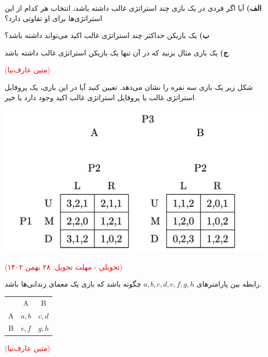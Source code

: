 \documentclass[11pt,a4paper]{article}
\begin{document}




\textbf{الف)}
آیا اگر فردی در یک بازی چند استراتژی غالب داشته باشد، انتخاب هر کدام از این استراتژی‌ها برای او تفاوتی دارد؟ 

\textbf{ب)}
یک بازیکن حداکثر چند استراتژی غالب اکید می‌تواند داشته باشد؟

\textbf{ج)}
یک بازی مثال بزنید که در آن تنها یک بازیکن استراتژی غالب داشته باشد. 

\vspace{0.5em}
\textcolor{red}{(متین عارف‌نیا)}




شکل زیر یک بازی سه نفره را نشان می‌دهد. تعیین کنید آیا در این بازی، یک پروفایل استراتژی غالب یا پروفایل استراتژی غالب اکید وجود دارد یا خیر.

	{\begin{center}\includegraphics[width=0.5\linewidth]{pics/DSE}\end{center}}

\vspace{0.5em}
\textcolor{red}{(تحویلی - مهلت تحویل: ۲۸ بهمن ۱۴۰۲)}




رابطه بین پارامترهای $a,b,c,d,e,f,g,h$ چگونه باشد که 
بازی یک معمای زندانی‌ها باشد.

\begin{latin}
	\begin{center}
		\begin{tabular}{ r|c|c| }
			\multicolumn{1}{r}{}
			&  \multicolumn{1}{c}{A}
			& \multicolumn{1}{c}{B} \\
			\cline{2-3}
			A & $a,b$ & $c,d$ \\
			\cline{2-3}
			B & $e,f$ & $g,h$ \\
			\cline{2-3}
		\end{tabular}
	\end{center}
\end{latin}
\vspace{-1.5em}
\textcolor{red}{(متین عارف‌نیا)}
\end{document}

